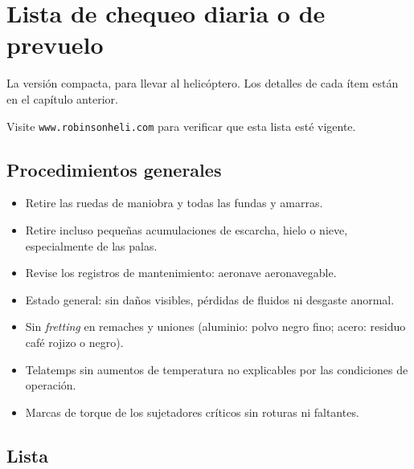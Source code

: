 \chapter{Lista de chequeo diaria o de prevuelo}
\label{cap:prevuelo-lista}

\opening{La versión compacta, para llevar al helicóptero. Los detalles de cada ítem están en el capítulo anterior.}

Visite \texttt{www.robinsonheli.com} para verificar que esta lista esté vigente.

\section{Procedimientos generales}

\begin{itemize}
\item Retire las ruedas de maniobra y todas las fundas y amarras.
\item Retire incluso pequeñas acumulaciones de escarcha, hielo o nieve, especialmente de las palas.
\item Revise los registros de mantenimiento: aeronave aeronavegable.
\item Estado general: sin daños visibles, pérdidas de fluidos ni desgaste anormal.
\item Sin \emph{fretting} en remaches y uniones (aluminio: polvo negro fino; acero: residuo café rojizo o negro).
\item Telatemps sin aumentos de temperatura no explicables por las condiciones de operación.
\item Marcas de torque de los sujetadores críticos sin roturas ni faltantes.
\end{itemize}

\section{Lista}


